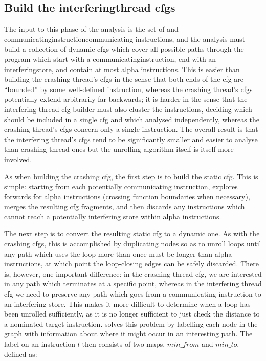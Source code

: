 \subsection[Building the \glsentrytext{interferingthread} \glsentrytext{cfg}s]{Build the \gls{interferingthread} \glspl{cfg}}

The input to this phase of the analysis is the set of
 and
\gls{communicatinginstruction}{communicating} instructions, and the
analysis must build a collection of dynamic \glspl{cfg} which cover
all possible paths through the program which start with a
\gls{communicatinginstruction}, end with an \gls{interferingstore},
and contain at most \gls{alpha} instructions.  This is easier than
building the crashing thread's \glspl{cfg} in the sense that both ends
of the \gls{cfg} are ``bounded'' by some well-defined instruction,
whereas the crashing thread's \glspl{cfg} potentially extend
arbitrarily far backwards; it is harder in the sense that the
interfering thread \gls{cfg} builder must also cluster the
instructions, deciding which should be included in a single \gls{cfg}
and which analysed independently, whereas the crashing thread's
\glspl{cfg} concern only a single instruction.  The overall result is
that the interfering thread's \glspl{cfg} tend to be significantly
smaller and easier to analyse than crashing thread ones but the
unrolling algorithm itself is itself more involved.

As when building the crashing \gls{cfg}, the first step is to build
the static \gls{cfg}.  This is simple: starting from each potentially
communicating instruction, {\technique} explores forwards for
\gls{alpha} instructions (crossing function boundaries when
necessary), merges the resulting \gls{cfg} fragments, and then
discards any instructions which cannot reach a potentially interfering
store within \gls{alpha} instructions.

The next step is to convert the resulting static \gls{cfg} to a
dynamic one.  As with the crashing \glspl{cfg}, this is accomplished
by duplicating nodes so as to unroll loops until any path which uses
the loop more than once must be longer than \gls{alpha} instructions,
at which point the loop-closing edges can be safely discarded.  There
is, however, one important difference: in the crashing thread
\gls{cfg}, we are interested in any path which terminates at a
specific point, whereas in the interfering thread \gls{cfg} we need to
preserve any path which goes from a communicating instruction to an
interfering store.  This makes it more difficult to determine when a
loop has been unrolled sufficiently, as it is no longer sufficient to
just check the distance to a nominated target instruction.
{\Technique} solves this problem by labelling each node in the graph
with information about where it might occur in an interesting path.
The label on an instruction $l$ then consists of two maps,
$\mathit{min\_from}$ and $\mathit{min\_to}$, defined as:

